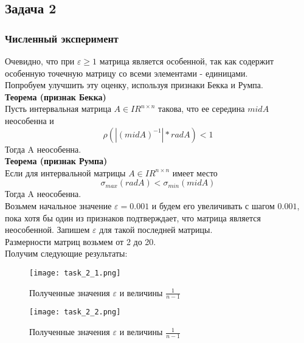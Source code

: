 \subsection{Задача 2}

\subsubsection{Численный эксперимент}

Очевидно, что при $\varepsilon \geq 1$ матрица является особенной, так как содержит особенную точечную матрицу со всеми элементами - единицами. \\
Попробуем улучшить эту оценку, используя признаки Бекка и Румпа. \\

\textbf{Теорема (признак Бекка)} \\
Пусть интервальная матрица $A \in IR^{n \times n}$ такова, что ее середина $mid A$ неособенна и
\begin{equation}
	\rho(|(mid A)^{-1}| * rad A) < 1
\end{equation}
Тогда A неособенна. \\

\textbf{Теорема (признак Румпа)} \\
Если для интервальной матрицы $A \in IR^{n \times n}$ имеет место
\begin{equation}
	\sigma_{max}(rad A) < \sigma_{min}(mid A)
\end{equation}
Тогда A неособенна. \\

Возьмем начальное значение $\varepsilon = 0.001$ и будем его увеличивать с шагом $0.001$, пока хотя бы один из признаков подтверждает, что матрица является неособенной. Запишем $\varepsilon$ для такой последней матрицы.\\
Размерности матриц возьмем от 2 до 20. \\
Получим следующие результаты:

\begin{figure}[h]
	\centering
	\texttt{[image: task\_2\_1.png]}
	\caption{Полученные значения $\varepsilon$ и величины $\frac{1}{n - 1}$}
\end{figure}

\newpage

\begin{figure}[h]
	\centering
	\texttt{[image: task\_2\_2.png]}
	\caption{Полученные значения $\varepsilon$ и величины $\frac{1}{n - 1}$}
\end{figure}

